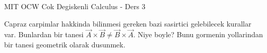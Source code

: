 \documentclass[12pt,fleqn]{article}
\begin{document}
MIT OCW Cok Degiskenli Calculus - Ders 3

Capraz carpimlar hakkinda bilinmesi gereken bazi sasirtici gelebilecek
kurallar var. Bunlardan bir tanesi $\vec{A} \times \vec{B} \ne \vec{B}
\times \vec{A}$. Niye boyle? Bunu 
gormenin yollarindan bir tanesi geometrik olarak dusunmek.
\end{document}
